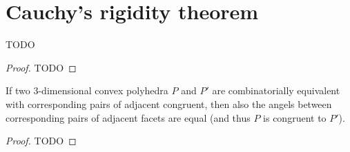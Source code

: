 \chapter{Cauchy's rigidity theorem}


\begin{lemma}
  \label{arm_lemma}
  TODO
\end{lemma}
\begin{proof}
  TODO
\end{proof}

\begin{theorem}
  \label{cauchy_rigidity}
  If two \(3\)-dimensional convex polyhedra \(P\) and \(P'\) are
  combinatorially equivalent with corresponding pairs of adjacent congruent,
  then also the angels between corresponding pairs of adjacent
  facets are equal (and thus \(P\) is congruent to \(P'\)).
\end{theorem}
\begin{proof}
  TODO
\end{proof}
